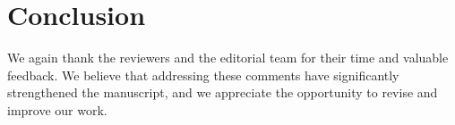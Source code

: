 \documentclass[11pt]{article}
\begin{document}








\section{Conclusion}

We again thank the reviewers and the editorial team for their time and valuable feedback. We believe that addressing these comments have significantly strengthened the manuscript, and we appreciate the opportunity to revise and improve our work.

\clearpage


  
\end{document}
